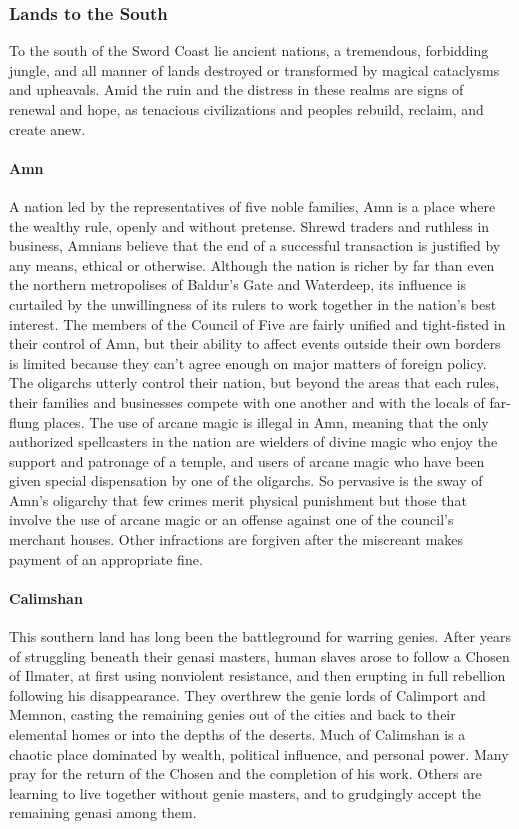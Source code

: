 \documentclass[10pt,a4paper,twoside,twocolumn,openany,bg=print,nodeprecatedcode]{dndbook}
\begin{document}
\subsubsection{Lands to the South}
To the south of the Sword Coast lie ancient nations, a tremendous, forbidding jungle, and all manner of lands destroyed or transformed by magical cataclysms and upheavals. Amid the ruin and the distress in these realms are signs of renewal and hope, as tenacious civilizations and peoples rebuild, reclaim, and create anew.
\paragraph{Amn}
A nation led by the representatives of five noble families, Amn is a place where the wealthy rule, openly and without pretense. Shrewd traders and ruthless in business, Amnians believe that the end of a successful transaction is justified by any means, ethical or otherwise. Although the nation is richer by far than even the northern metropolises of Baldur's Gate and Waterdeep, its influence is curtailed by the unwillingness of its rulers to work together in the nation's best interest. The members of the Council of Five are fairly unified and tight-fisted in their control of Amn, but their ability to affect events outside their own borders is limited because they can't agree enough on major matters of foreign policy. The oligarchs utterly control their nation, but beyond the areas that each rules, their families and businesses compete with one another and with the locals of far-flung places.
The use of arcane magic is illegal in Amn, meaning that the only authorized spellcasters in the nation are wielders of divine magic who enjoy the support and patronage of a temple, and users of arcane magic who have been given special dispensation by one of the oligarchs. So pervasive is the sway of Amn's oligarchy that few crimes merit physical punishment but those that involve the use of arcane magic or an offense against one of the council's merchant houses. Other infractions are forgiven after the miscreant makes payment of an appropriate fine.
\paragraph{Calimshan}
This southern land has long been the battleground for warring genies. After years of struggling beneath their genasi masters, human slaves arose to follow a Chosen of Ilmater, at first using nonviolent resistance, and then erupting in full rebellion following his disappearance. They overthrew the genie lords of Calimport and Memnon, casting the remaining genies out of the cities and back to their elemental homes or into the depths of the deserts.
Much of Calimshan is a chaotic place dominated by wealth, political influence, and personal power. Many pray for the return of the Chosen and the completion of his work. Others are learning to live together without genie masters, and to grudgingly accept the remaining genasi among them.
\end{document}
